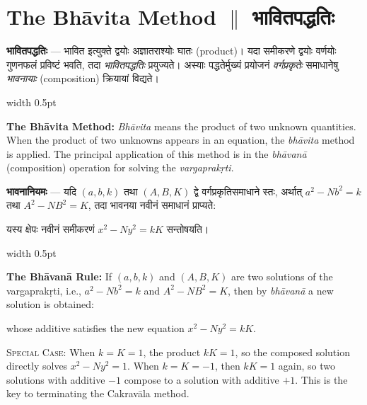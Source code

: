 \documentclass[11pt,a4paper]{article}
\newcommand{\dev}[1]{{\devanagarifont #1}}
\newcommand{\vs}{\vspace{0.5em}}
\newcommand{\bilingual}[2]{%
  \par\vspace{0.5em}%
  \noindent\begin{minipage}[t]{0.47\textwidth}%
  \setlength{\parindent}{0pt}%
  \small #1%
  \end{minipage}%
  \hfill\textcolor{columnrule}{\vrule width 0.5pt}\hfill%
  \begin{minipage}[t]{0.47\textwidth}%
  \setlength{\parindent}{0pt}%
  \small\raggedright #2%
  \end{minipage}%
  \par\vspace{0.5em}%
}
\begin{document}
\newpage

\section*{The Bh\={a}vita Method $\parallel$ भावितपद्धतिः}

\bilingual{\textbf{भावितपद्धतिः} — \dev{भावित} इत्युक्ते द्वयोः अज्ञातराश्योः घातः (product)। यदा समीकरणे द्वयोः वर्णयोः गुणनफलं प्रविष्टं भवति, तदा \textit{भावितपद्धतिः} प्रयुज्यते। अस्याः पद्धतेर्मुख्यं प्रयोजनं \textit{वर्गप्रकृतेः} समाधानेषु \textit{भावनायाः} (composition) क्रियायां विद्यते।
}{%
\textbf{The Bh\={a}vita Method:} \textit{Bh\={a}vita} means the product of two unknown quantities. When the product of two unknowns appears in an equation, the \textit{bh\={a}vita} method is applied. The principal application of this method is in the \textit{bh\={a}van\={a}} (composition) operation for solving the \textit{vargaprak\d{r}ti}.}

\vs

\bilingual{\textbf{भावनानियमः} — यदि $(a, b, k)$ तथा $(A, B, K)$ द्वे वर्गप्रकृतिसमाधाने स्तः, अर्थात् $a^2 - Nb^2 = k$ तथा $A^2 - NB^2 = K$, तदा भावनया नवीनं समाधानं प्राप्यते:
\begin{center}
\fbox{$x = aA \pm NbB$, \quad $y = aB \pm Ab$}
\end{center}
\vspace{0.3em}
यस्य क्षेपः नवीनं समीकरणं $x^2 - Ny^2 = kK$ सन्तोषयति।
}{%
\textbf{The Bh\={a}van\={a} Rule:} If $(a, b, k)$ and $(A, B, K)$ are two solutions of the vargaprak\d{r}ti, i.e., $a^2 - Nb^2 = k$ and $A^2 - NB^2 = K$, then by \textit{bh\={a}van\={a}} a new solution is obtained:
\begin{center}
\fbox{$x = aA \pm NbB$, \quad $y = aB \pm Ab$}
\end{center}
\vspace{0.3em}
whose additive satisfies the new equation $x^2 - Ny^2 = kK$.

\vs
\textsc{Special Case:} When $k = K = 1$, the product $kK = 1$, so the composed solution directly solves $x^2 - Ny^2 = 1$. When $k = K = -1$, then $kK = 1$ again, so two solutions with additive $-1$ compose to a solution with additive $+1$. This is the key to terminating the Cakrav\={a}la method.}

\newpage

\end{document}
